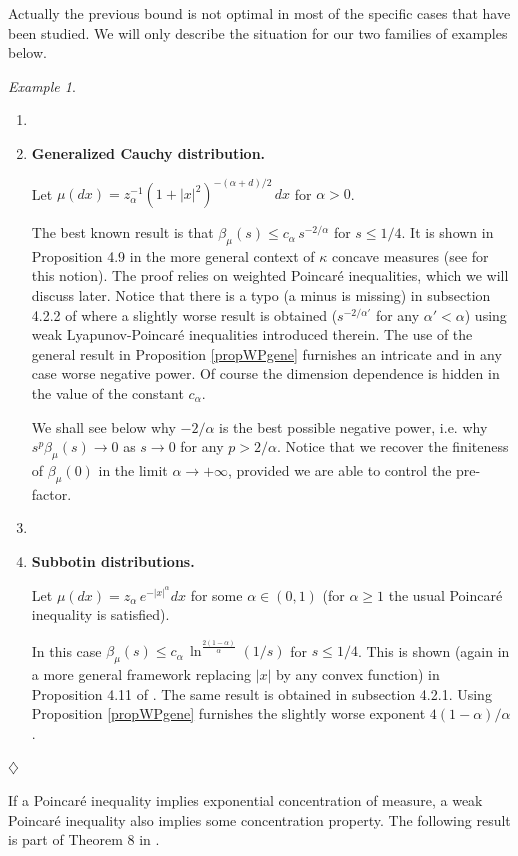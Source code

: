 \documentclass[11pt,reqno]{amsart}
\numberwithin{equation}{section}
\theoremstyle{definition}
\theoremstyle{remark}
\newtheorem{example}[theorem]{Example}
\begin{document}
Actually the previous bound is not optimal in most of the specific cases that have been studied. We will only describe the situation for our two families of examples below.
\begin{example}\label{exampweak}
\begin{enumerate}
\item[]
\item[(1)] \textbf{Generalized Cauchy distribution.} 

Let $\mu(dx)= z_\alpha^{-1} (1+|x|^2)^{- (\alpha+d)/2} \, dx$ for $\alpha>0$. 

The best known result is that $\beta_\mu(s)\leq  c_\alpha \,  s^{-2/\alpha}$ for $s\leq 1/4$. It is shown in \cite{CGGR} Proposition 4.9 in the more general context of $\kappa$ concave measures (see \cite{Bobkappa} for this notion). The proof relies on weighted Poincar\'e inequalities, which we will discuss later. Notice that there is a typo (a minus is missing) in subsection 4.2.2 of \cite{BCG} where a slightly worse result is obtained ($s^{-2/\alpha'}$ for any $\alpha'<\alpha$) using weak Lyapunov-Poincar\'e inequalities introduced therein. The use of the general result in Proposition \ref{propWPgene} furnishes an intricate and in any case worse negative power. Of course the dimension dependence is hidden in the value of the constant $c_\alpha$.

We shall see below why $- 2/\alpha$ is the best possible negative power, i.e. why $s^{p} \beta_\mu(s) \to 0$ as $s \to 0$ for any $p>2/\alpha$. Notice that we recover the finiteness of $\beta_\mu(0)$ in the limit $\alpha \to + \infty$, provided we are able to control the pre-factor.
\item[]
\item[(2)] \textbf{Subbotin distributions.} 

Let $\mu(dx) = z_{\alpha} \, e^{-|x|^\alpha} dx$ for some $\alpha \in (0,1)$ (for $\alpha \geq 1$ the usual Poincar\'e inequality is satisfied).

In this case $\beta_\mu(s) \leq c_\alpha \, \ln^{\frac{2(1-\alpha)}{\alpha}}(1/s)$ for $s\leq 1/4$. This is shown (again in a more general framework replacing $|x|$ by any convex function) in Proposition 4.11 of \cite{CGGR}. The same result is obtained in \cite{BCG} subsection 4.2.1. Using Proposition \ref{propWPgene} furnishes the slightly worse exponent $4(1-\alpha)/\alpha$.
\end{enumerate}
\hfill $\diamondsuit$
\end{example}
If a Poincar\'e inequality implies exponential concentration of measure, a weak Poincar\'e inequality also implies some concentration property. The following result is part of Theorem 8 in \cite{BCR2}.
\end{document}
